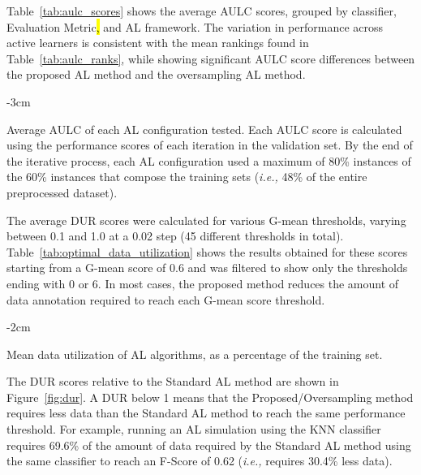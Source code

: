 \documentclass[preprint, 12pt]{elsarticle}
\begin{document}
Table~\ref{tab:aulc_scores} shows the average AULC scores, grouped by
classifier, Evaluation Metric\hl{,} and AL framework. The variation in
performance across active learners is consistent with the mean rankings found
in Table~\ref{tab:aulc_ranks}, while showing significant AULC score
differences between the proposed AL method and the oversampling AL method.

\begin{table}
	\centering
    \addtolength{\leftskip} {-3cm}
    \addtolength{\rightskip}{-3cm}
    \caption{\label{tab:aulc_scores}
        Average AULC of each AL configuration tested. Each AULC score is
        calculated using the performance scores of each iteration in the
        validation set. By the end of the iterative process, each AL
        configuration used a maximum of 80\% instances of the 60\% instances
        that compose the training sets (\textit{i.e.,} 48\% of the entire
        preprocessed dataset).
    }
\end{table}

The average DUR scores were calculated for various G-mean thresholds, varying
between 0.1 and 1.0 at a 0.02 step (45 different thresholds in total).
Table~\ref{tab:optimal_data_utilization} shows the results obtained for these
scores starting from a G-mean score of 0.6 and was filtered to show only the
thresholds ending with 0 or 6. In most cases, the proposed method reduces the
amount of data annotation required to reach each G-mean score threshold.

\begin{table}
    \centering
    \addtolength{\leftskip} {-2cm}
    \addtolength{\rightskip}{-2cm}
    \caption{\label{tab:optimal_data_utilization}
        Mean data utilization of AL algorithms, as a percentage of the
        training set.
    }
\end{table}

The DUR scores relative to the Standard AL method are shown in
Figure~\ref{fig:dur}. A DUR below 1 means that the Proposed/Oversampling
method requires less data than the Standard AL method to reach the same
performance threshold. For example, running an AL simulation using the KNN
classifier requires 69.6\% of the amount of data required by the Standard AL
method using the same classifier to reach an F-Score of 0.62 (\textit{i.e.,}
requires 30.4\% less data).
\end{document}
